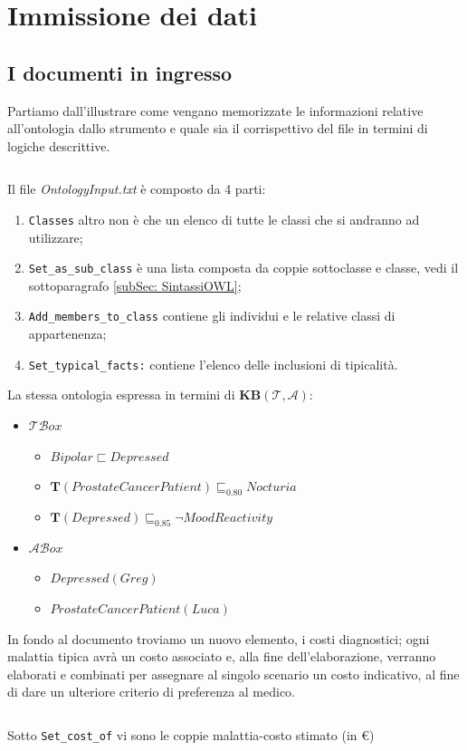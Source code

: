 \section{Immissione dei dati}
\subsection{I documenti in ingresso}
Partiamo dall'illustrare come vengano memorizzate le informazioni relative all'ontologia dallo strumento 
e quale sia il corrispettivo del file in termini di logiche descrittive. 
\inputminted[lastline=11]{text}{codice/ExOntoInput.txt}
Il file \emph{OntologyInput.txt} è composto da 4 parti:\\
\begin{enumerate}
	\item \texttt{Classes} altro non è che un elenco di tutte le classi che si andranno ad utilizzare;
	\item \texttt{Set_as_sub_class} è una lista composta da coppie sottoclasse e classe, vedi il sottoparagrafo \ref{subSec: SintassiOWL};
	\item \texttt{Add_members_to_class} contiene gli individui e le relative classi di appartenenza; 
	\item \texttt{Set_typical_facts:} contiene l'elenco delle inclusioni di tipicalità.
\end{enumerate}

La stessa ontologia espressa in termini di \textbf{KB}$ (\mathcal{T}, \mathcal{A}) $:
\begin{itemize}
	\item $\mathcal{TB}ox$ 
		\begin{itemize}
			\item $ Bipolar \sqsubset Depressed $
			\item $ \mathbf T(ProstateCancerPatient) \sqsubseteq_{0.80} Nocturia $
			\item $ \mathbf T(Depressed) \sqsubseteq_{0.85} \neg MoodReactivity $
		\end{itemize}
	\item $\mathcal{AB}ox$ 
		\begin{itemize}
			\item $ Depressed(Greg) $
			\item $ ProstateCancerPatient(Luca) $
		\end{itemize}
\end{itemize}

In fondo al documento troviamo un nuovo elemento, i costi diagnostici; ogni malattia tipica avrà
un costo associato e, alla fine dell'elaborazione, verranno elaborati e combinati per assegnare al singolo
scenario un costo indicativo, al fine di dare un ulteriore criterio di preferenza al medico.
\inputminted[firstline=13]{text}{codice/ExOntoInput.txt}
Sotto \texttt{Set_cost_of} vi sono le coppie malattia-costo stimato (in €)

